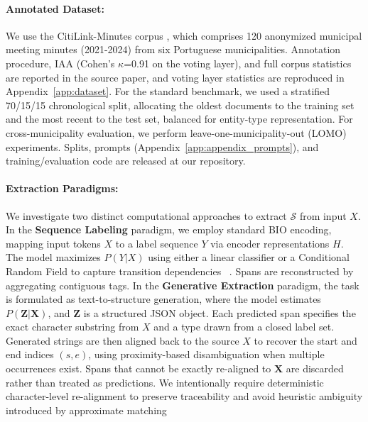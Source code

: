 \documentclass[11pt]{article}
\begin{document}





\paragraph{Annotated Dataset:} We use the CitiLink-Minutes corpus \cite{CitiLinkMinutes2026}, which comprises 120 anonymized municipal meeting minutes (2021-2024) from six Portuguese municipalities. Annotation procedure, IAA (Cohen's $\kappa$=0.91 on the voting layer), and full corpus statistics are reported in the source paper, and voting layer statistics are reproduced in Appendix~\ref{app:dataset}. For the standard benchmark, we used a stratified 70/15/15 chronological split, allocating the oldest documents to the training set and the most recent to the test set, balanced for entity-type representation. For cross-municipality evaluation, we perform leave-one-municipality-out (LOMO) experiments. Splits, prompts (Appendix~\ref{app:appendix_prompts}), and training/evaluation code are released at our repository. 

\paragraph{Extraction Paradigms:} We investigate two distinct computational  approaches to extract $\mathcal{S}$ from input $X$. In the \textbf{Sequence Labeling} paradigm, we employ standard BIO encoding, mapping input tokens $X$ to a label sequence $Y$ via encoder representations $H$. The model maximizes $P(Y|X)$ using either a linear classifier or a Conditional Random Field to capture transition dependencies ~\cite{Lafferty2001}. Spans are reconstructed by aggregating contiguous tags. In the \textbf{Generative Extraction} paradigm, the task is formulated as text-to-structure generation, where the model estimates $P(\mathbf{Z} | \mathbf{X})$, and $\mathbf{Z}$ is a structured JSON object. Each predicted span specifies the exact character substring from $X$ and a type drawn from a closed label set. Generated strings are then aligned back to the source $X$ to recover the start and end indices $(s, e)$, using proximity-based disambiguation when multiple occurrences exist. Spans that cannot be exactly re-aligned to $\mathbf{X}$ are discarded rather than treated as predictions. We intentionally require deterministic character-level re-alignment to preserve traceability and avoid heuristic ambiguity introduced by approximate matching
\end{document}
